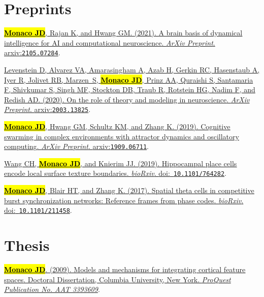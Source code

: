 \documentclass[10pt]{article}
\newcommand{\itemtitle}[1]{{\color{hopkinsblue}\ul{#1}}}
\newcommand{\joehl}[1]{\hl{\textbf{#1}}}
\newcommand{\doi}[1]{{\color{darkgray}doi:}~{\color{dimgray}\texttt{#1}}}
\newcommand{\arxiv}[1]{\emph{ArXiv Preprint}.
  {\color{darkgray}arxiv:}{\color{dimgray}\texttt{#1}}}
\begin{document}
\section*{Preprints}

\begin{description}
  \item \href{https://arxiv.org/abs/2105.07284}
    {\joehl{Monaco JD}, Rajan K, and Hwang GM. (2021). \itemtitle{A brain
      basis of dynamical intelligence for AI and computational neuroscience}.
    \arxiv{2105.07284}}.
  \item \href{https://arxiv.org/abs/2003.13825}
    {Levenstein D, Alvarez VA, Amarasingham A, Azab H, Gerkin RC, Hasenstaub
      A, Iyer R, Jolivet RB, Marzen~S, \joehl{Monaco JD}, Prinz AA, Quraishi
      S, Santamaria F, Shivkumar S, Singh MF, Stockton DB, Traub R, Rotstein
      HG, Nadim F, and Redish AD. (2020). \itemtitle{On the role of theory and
    modeling in neuroscience}. \arxiv{2003.13825}}.
  \item \href{https://arxiv.org/abs/1909.06711}
    {\joehl{Monaco JD}, Hwang GM, Schultz KM, and Zhang K. (2019).
    \itemtitle{Cognitive swarming in complex environments with attractor
    dynamics and oscillatory computing}. \arxiv{1909.06711}}.
  \item \href{http://doi.org/10.1101/764282}
    {Wang CH, \joehl{Monaco JD}, and Knierim JJ. (2019). \itemtitle{Hippocampal
      place cells encode local surface texture boundaries}. \emph{bioRxiv}.
    \doi{10.1101/764282}}.
  \item \href{http://dx.doi.org/10.1101/211458}
    {\joehl{Monaco JD}, Blair HT, and Zhang K. (2017). \itemtitle{Spatial theta
        cells in competitive burst synchronization networks: Reference frames from
    phase codes}. \emph{bioRxiv}. \doi{10.1101/211458}}.
\end{description}

\section*{Thesis}

\begin{description}
  \item \href{http://search.proquest.com/docview/304862872/abstract}
    {\joehl{Monaco JD}. (2009). \itemtitle{Models and mechanisms for integrating
      cortical feature spaces}. Doctoral Dissertation, Columbia University, New
    York. \emph{ProQuest Publication No. AAT 3393609}}.
\end{description}
\end{document}
